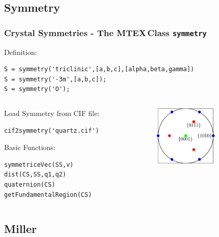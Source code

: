\documentclass{beamer}
\newcommand{\MTEX}{{\bf {\color{red}M}TEX\,}}%
\begin{document}
\subsection*{Symmetry} 
\begin{frame}[fragile]
  \frametitle{Crystal Symmetries - The \MTEX Class \texttt{\bf symmetry}}
  
  Definition:

\begin{lstlisting}
S = symmetry('triclinic',[a,b,c],[alpha,beta,gamma])
S = symmetry('-3m',[a,b,c]);
S = symmetry('O'); 
\end{lstlisting}

\medskip

\begin{columns}
  \begin{column}{8.5cm}

Load Symmetry from CIF file:

\begin{lstlisting}
cif2symmetry('quartz.cif')
\end{lstlisting}

\medskip

    Basic Functions:

\begin{lstlisting}
symmetriceVec(SS,v)
dist(CS,SS,q1,q2)   
quaternion(CS)
getFundamentalRegion(CS)
\end{lstlisting}
  \end{column}
  
  \begin{column}{3cm}
    \includegraphics[width=3cm]{pic/sym}
  \end{column}

\end{columns}

\end{frame}

\subsection*{Miller}
\end{document}
